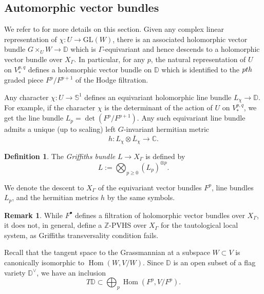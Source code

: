 \documentclass[10pt,letterpaper,english,reqno]{amsart}
\numberwithin{equation}{subsection}
\newcommand\C{{\mathbb C}}
\newcommand\bD{{\mathbb D}}
\newcommand\Z{{\mathbb Z}}
\newcommand\oL{{\overline L}}
\DeclareMathOperator{\Hom}{Hom}
\theoremstyle{definition}
\newtheorem{definition}[theorem]{Definition}
\newtheorem{remark}[theorem]{Remark}
\begin{document}



\subsection{Automorphic vector bundles}
We refer to \cite[Section 12.1]{carlson} for more details on this section. Given any complex linear representation of
$\chi\colon U\rightarrow \mathrm{GL}(W)$, there is an associated 
holomorphic vector bundle $G\times_U W\rightarrow \bD$
which is $\Gamma$-equivariant and hence descends to a holomorphic vector bundle over $X_\Gamma$. In particular, for any $p$, the natural representation of $U$ on $V^{p,q}_*$ defines a holomorphic vector bundle on $\bD$ which is identified to the $p{\rm th}$ graded piece $F^p/F^{p+1}$ of the Hodge filtration. 

Any character $\chi\colon U\to \mathbb{S}^1$ defines an equivariant 
holomorphic line bundle $L_\chi\rightarrow \bD$. For example,
if the character $\chi$ is the determinant of the action of
$U$ on $V^{p,q}_*$, we get the line bundle
$L_p=\det(F^p/F^{p+1}).$ Any such equivariant line
bundle admits a unique (up to scaling) left
$G$-invariant hermitian metric 
$$h\colon L_\chi\otimes \oL_{\chi}\to \C.$$

\begin{definition} The {\it Griffiths bundle}
$L\to X_\Gamma$ is defined by 
$$\textstyle L:=\bigotimes_{p\geq 0} (L_p)^{\otimes p}.$$ \end{definition}

We denote the descent
to $X_\Gamma$ of the equivariant vector bundles $F^p$, line bundles 
$L_p$, and the hermitian metrics $h$ by the same symbols.

\begin{remark} While $F^\bullet$ defines a filtration 
of holomorphic vector bundles over $X_\Gamma$, it does 
not, in general, define a $\Z$-PVHS over $X_\Gamma$
for the tautological local system, as Griffiths transversality condition fails. \end{remark}

Recall that the tangent space to the Grassmannian 
at a subspace $W\subset V$ is canonically isomorphic
to $\Hom(W,V/W)$. Since $\bD$ is an open subset of a
flag variety $\bD^\vee$, we have an inclusion
$$\textstyle T\bD\subset \bigoplus_p \Hom(F^p, V/F^p).$$
\end{document}
